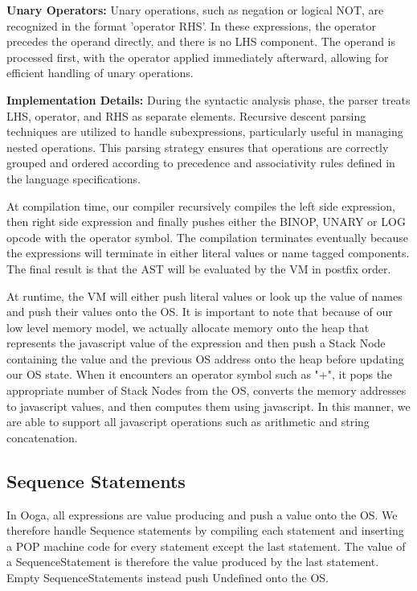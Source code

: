 \documentclass{report}
\begin{document}
\textbf{Unary Operators:} Unary operations, such as negation or logical NOT, are recognized in the format 'operator RHS'. In these expressions, the operator precedes the operand directly, and there is no LHS component. The operand is processed first, with the operator applied immediately afterward, allowing for efficient handling of unary operations.

\textbf{Implementation Details:} During the syntactic analysis phase, the parser treats LHS, operator, and RHS as separate elements. Recursive descent parsing techniques are utilized to handle subexpressions, particularly useful in managing nested operations. This parsing strategy ensures that operations are correctly grouped and ordered according to precedence and associativity rules defined in the language specifications.

At compilation time, our compiler recursively compiles the left side expression, then right side expression and finally pushes either the BINOP, UNARY or LOG opcode with the operator symbol. The compilation terminates eventually because the expressions will terminate in either literal values or name tagged components. The final result is that the AST will be evaluated by the VM in postfix order.

At runtime, the VM will either push literal values or look up the value of names and push their values onto the OS. It is important to note that because of our low level memory model, we actually allocate memory onto the heap that represents the javascript value of the expression and then push a Stack Node containing the value and the previous OS address onto the heap before updating our OS state. When it encounters an operator symbol such as "+", it pops the appropriate number of Stack Nodes from the OS, converts the memory addresses to javascript values, and then computes them using javascript. In this manner, we are able to support all javascript operations such as arithmetic and string concatenation.

\subsection{Sequence Statements}\label{section:value-producing}

In Ooga, all expressions are value producing and push a value onto the OS. We therefore handle Sequence statements by compiling each statement and inserting a POP machine code for every statement except the last statement. The value of a SequenceStatement is therefore the value produced by the last statement. Empty SequenceStatements instead push Undefined onto the OS.
\end{document}
